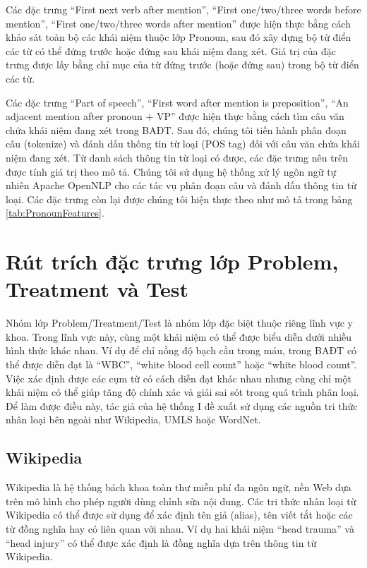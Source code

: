 Các đặc trưng ``First next verb after mention'', ``First one/two/three words before mention'', ``First one/two/three words after mention'' được hiện thực bằng cách khảo sát toàn bộ các khái niệm thuộc lớp Pronoun, sau đó xây dựng bộ từ điển các từ có thể đứng trước hoặc đứng sau khái niệm đang xét. Giá trị của đặc trưng được lấy bằng chỉ mục của từ đứng trước (hoặc đứng sau) trong bộ từ điển các từ.

Các đặc trưng ``Part of speech'', ``First word after mention is preposition'', ``An adjacent mention after pronoun + VP'' được hiện thực bằng cách tìm câu văn chứa khái niệm đang xét trong BAĐT. Sau đó, chúng tôi tiến hành phân đoạn câu (tokenize) và đánh dấu thông tin từ loại (POS tag) đối với câu văn chứa khái niệm đang xét. Từ danh sách thông tin từ loại có được, các đặc trưng nêu trên được tính giá trị theo mô tả. Chúng tôi sử dụng hệ thống xử lý ngôn ngữ tự nhiên Apache OpenNLP cho các tác vụ phân đoạn câu và đánh dấu thông tin từ loại. Các đặc trưng còn lại được chúng tôi hiện thực theo như mô tả trong bảng \ref{tab:PronounFeatures}.

\section{Rút trích đặc trưng lớp Problem, Treatment và Test}
Nhóm lớp Problem/Treatment/Test là nhóm lớp đặc biệt thuộc riêng lĩnh vực y khoa. Trong lĩnh vực này, cùng một khái niệm có thể được biểu diễn dưới nhiều hình thức khác nhau. Ví dụ để chỉ nồng độ bạch cầu trong máu, trong BAĐT có thể được diễn đạt là ``WBC'', ``white blood cell count'' hoặc ``white blood count''. Việc xác định được các cụm từ có cách diễn đạt khác nhau nhưng cùng chỉ một khái niệm có thể giúp tăng độ chính xác và giải sai sót trong quá trình phân loại. Để làm được điều này, tác giả của hệ thống I đề xuất sử dụng các nguồn tri thức nhân loại bên ngoài như Wikipedia, UMLS hoặc WordNet.

\subsection*{Wikipedia}
Wikipedia là hệ thống bách khoa toàn thư miễn phí đa ngôn ngữ, nền Web dựa trên mô hình cho phép người dùng chỉnh sửa nội dung. Các tri thức nhân loại từ Wikipedia có thể được sử dụng để xác định tên giả (alias), tên viết tắt hoặc các từ đồng nghĩa hay có liên quan với nhau. Ví dụ hai khái niệm ``head trauma'' và ``head injury'' có thể được xác định là đồng nghĩa dựa trên thông tin từ Wikipedia.

